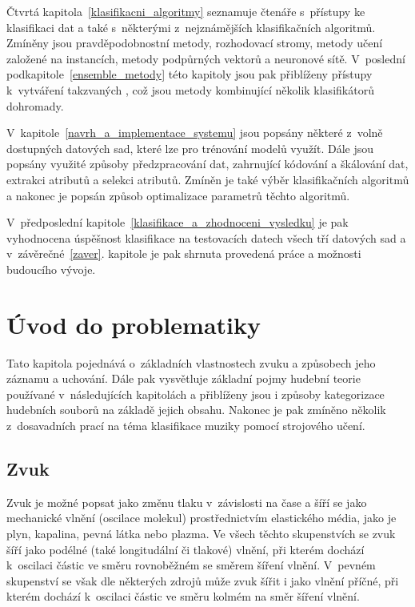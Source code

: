 Čtvrtá kapitola~\ref{klasifikacni_algoritmy} seznamuje čtenáře s~přístupy ke klasifikaci dat a také s~některými z~nejznámějších klasifikačních algoritmů. Zmíněny jsou pravděpodobnostní metody, rozhodovací stromy, metody učení založené na instancích, metody podpůrných vektorů a neuronové sítě. V~poslední podkapitole~\ref{ensemble_metody} této kapitoly jsou pak přiblíženy přístupy k~vytváření takzvaných , což jsou metody kombinující několik klasifikátorů dohromady.

V~kapitole~\ref{navrh_a_implementace_systemu} jsou popsány některé z~volně dostupných datových sad, které lze pro trénování modelů využít. Dále jsou popsány využité způsoby předzpracování dat, zahrnující kódování a škálování dat, extrakci atributů a selekci atributů. Zmíněn je také výběr klasifikačních algoritmů a nakonec je popsán způsob optimalizace parametrů těchto algoritmů.

V~předposlední kapitole~\ref{klasifikace_a_zhodnoceni_vysledku} je pak vyhodnocena úspěšnost klasifikace na testovacích datech všech tří datových sad a v~závěrečné~\ref{zaver}. kapitole je pak shrnuta provedená práce a možnosti budoucího vývoje.

\chapter{Úvod do problematiky}
\label{uvod_do_problematiky}
Tato kapitola pojednává o~základních vlastnostech zvuku a způsobech jeho záznamu a uchování. Dále pak vysvětluje základní pojmy hudební teorie používané v~následujících kapitolách a přiblíženy jsou i způsoby kategorizace hudebních souborů na základě jejich obsahu. Nakonec je pak zmíněno několik z~dosavadních prací na téma klasifikace muziky pomocí strojového učení.

\section{Zvuk}
\label{zvuk}
Zvuk je možné popsat jako změnu tlaku v~závislosti na čase a šíří se jako mechanické vlnění (oscilace molekul) prostřednictvím elastického média, jako je plyn, kapalina, pevná látka nebo plazma. Ve všech těchto skupenstvích se zvuk šíří jako podélné (také longitudální či tlakové) vlnění, při kterém dochází k~oscilaci částic ve směru rovnoběžném se směrem šíření vlnění. V~pevném skupenství se však dle některých zdrojů může zvuk šířit i jako vlnění příčné, při kterém dochází k~oscilaci částic ve směru kolmém na směr šíření vlnění.\cite{leisure_2017}\cite{music_theory}

